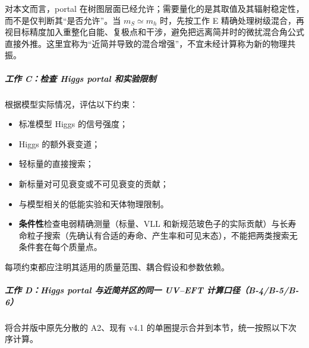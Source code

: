\documentclass[
]{article}
\begin{document}
对本文而言，portal
在树图层面已经允许；需要量化的是其取值及其辐射稳定性，而不是仅判断其``是否允许''。当
\(m_S\simeq m_h\) 时，先按工作 E
精确处理树级混合，再视目标精度加入重整化自能、复极点和干涉，避免把远离简并时的微扰混合角公式直接外推。这里宜称为``近简并导致的混合增强''，不宜未经计算称为新的物理共振。

\subparagraph{工作 C：检查 Higgs portal
和实验限制}\label{ux5de5ux4f5c-cux68c0ux67e5-higgs-portal-ux548cux5b9eux9a8cux9650ux5236}

根据模型实际情况，评估以下约束：

\begin{itemize}
\item
  标准模型 Higgs 的信号强度；
\item
  Higgs 的额外衰变道；
\item
  轻标量的直接搜索；
\item
  新标量对可见衰变或不可见衰变的贡献；
\item
  与模型相关的低能实验和天体物理限制。
\item
  \textbf{条件性}检查电弱精确测量（标量、VLL
  和新规范玻色子的实际贡献）与长寿命粒子搜索（先确认有合适的寿命、产生率和可见末态），不能把两类搜索无条件套在每个质量点。
\end{itemize}

每项约束都应注明其适用的质量范围、耦合假设和参数依赖。

\subparagraph{工作 D：Higgs portal 与近简并区的同一 UV--EFT
计算口径（B-4/B-5/B-6）}\label{ux5de5ux4f5c-dhiggs-portal-ux4e0eux8fd1ux7b80ux5e76ux533aux7684ux540cux4e00-uveft-ux8ba1ux7b97ux53e3ux5f84b-4b-5b-6}

将合并版中原先分散的 A2、现有 v4.1
的单圈提示合并到本节，统一按照以下次序计算。
\end{document}
